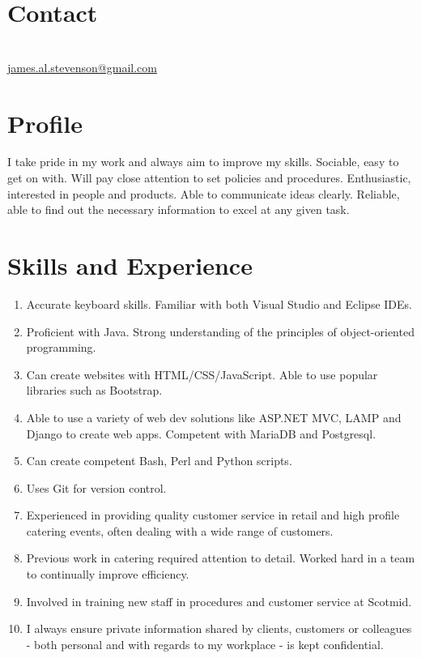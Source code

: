 \documentclass[12pt, a4paper]{article}
\begin{document}
\par{\bigskip\par}

\section{Contact}

\large{}\\
\href{mailto:james.al.stevenson@gmail.com}{james.al.stevenson@gmail.com}


\section{Profile}

\large{I take pride in my work and always aim to improve my skills.  
Sociable, easy to get on with.
Will pay close attention to set policies and procedures. 
Enthusiastic, interested in people and products. 
Able to communicate ideas clearly. 
Reliable, able to find out the necessary information to excel at any given task.}

\section{Skills and Experience}


\begin{enumerate}
	\item Accurate keyboard skills. Familiar with both Visual Studio and Eclipse IDEs.
	\item Proficient with Java. Strong understanding of the principles of object-oriented programming. 
	\item Can create websites with HTML/CSS/JavaScript. Able to use popular libraries such as Bootstrap.
	\item Able to use a variety of web dev solutions like ASP.NET MVC, LAMP and Django to create web apps. Competent with MariaDB and Postgresql.
        \item Can create competent Bash, Perl and Python scripts.
	\item Uses Git for version control.
	\item Experienced in providing quality customer service in retail and high profile catering events, often dealing with a wide range of customers.
	\item Previous work in catering required attention to detail. Worked hard in a team to continually improve efficiency.
	\item Involved in training new staff in procedures and customer service at Scotmid.
	\item I always ensure private information shared by clients, customers or colleagues - both personal and with regards to my workplace - is kept confidential.
\end{enumerate}
\end{document}
